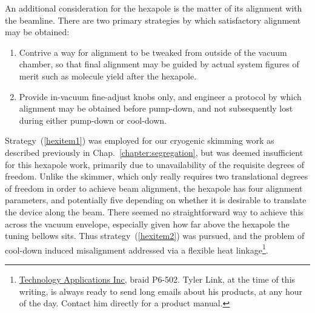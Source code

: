 An additional consideration for the hexapole is the matter of its alignment with the beamline.
There are two primary strategies by which satisfactory alignment may be obtained:
\begin{enumerate}
\item Contrive a way for alignment to be tweaked from outside of the vacuum chamber, so that final alignment may be guided by actual system figures of merit such as molecule yield after the hexapole. \label{hexitem1}
\item Provide in-vacuum fine-adjust knobs only, and engineer a protocol by which alignment may be obtained before pump-down, and not subsequently lost during either pump-down or cool-down. \label{hexitem2}
\end{enumerate}
Strategy~(\ref{hexitem1}) was employed for our cryogenic skimming work as described previously in Chap.~\ref{chapter:segregation}, but was deemed insufficient for this hexapole work, primarily due to unavailability of the requisite degrees of freedom.
Unlike the skimmer, which only really requires two translational degrees of freedom in order to achieve beam alignment, the hexapole has four alignment parameters, and potentially five depending on whether it is desirable to translate the device along the beam.
There seemed no straightforward way to achieve this across the vacuum envelope, especially given how far above the hexapole the tuning bellows sits.
Thus strategy~(\ref{hexitem2}) was pursued, and the problem of cool-down induced misalignment addressed via a flexible heat linkage\footnote{\href{https://www.techapps.com/}{Technology Applications Inc,} braid P6-502. Tyler Link, at the time of this writing, is always ready to send long emails about his products, at any hour of the day. Contact him directly for a product manual.}\!\!.

